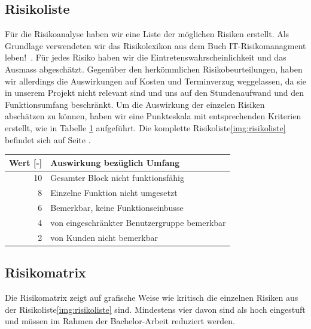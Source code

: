 \subsection{Risikoliste}
Für die Risikoanalyse haben wir eine Liste der möglichen  Risiken erstellt. Als Grundlage verwendeten wir das Risikolexikon aus dem Buch \flqq IT-Risikomanagment leben!\frqq ~\cite{AhrendtsFabian2008Il:w}. 
Für jedes Risiko haben wir die Eintretenswahrscheinlichkeit und das Ausmass abgeschätzt. Gegenüber den herkömmlichen Risikobeurteilungen, haben wir allerdings die Auswirkungen auf Kosten und Terminverzug weggelassen, da sie in unserem Projekt nicht relevant sind und uns auf den Stundenaufwand und den Funktionsumfang beschränkt. Um die Auswirkung der einzelen Risiken abschätzen zu können, haben wir eine Punkteskala mit entsprechenden Kriterien erstellt, wie in Tabelle \ref{tab:auswirkung} aufgeführt. Die komplette Risikoliste\ref{img:risikoliste} befindet sich auf Seite \pageref{img:risikoliste}.

\vspace{5mm} %

\begin{table}[]
\centering
\label{tab:auswirkung}
\begin{tabular}{rl}
Wert	[-]	& 	Auswirkung bezüglich Umfang \\
\hline
10	&	Gesamter Block nicht funktionsfähig \\
8	&	Einzelne Funktion nicht umgesetzt  \\
6	&	Bemerkbar, keine Funktionseinbusse \\
4	&	von eingeschränkter Benutzergruppe bemerkbar \\
2	&	von Kunden nicht bemerkbar
\end{tabular}
\end{table}

\subsection{Risikomatrix}
Die Risikomatrix zeigt auf grafische Weise wie kritisch die einzelnen Risiken aus der Risikoliste\ref{img:risikoliste}  sind. Mindestens vier davon sind als hoch eingestuft und müssen im Rahmen der Bachelor-Arbeit reduziert werden.

